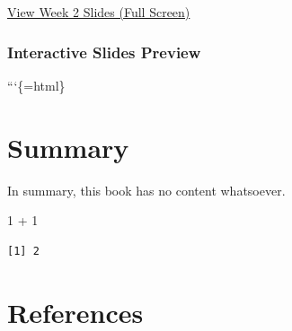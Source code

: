 \documentclass[
  letterpaper,
  DIV=11,
  numbers=noendperiod]{scrreprt}
\newenvironment{Shaded}{\begin{snugshade}}{\end{snugshade}}
\newcommand{\DecValTok}[1]{\textcolor[rgb]{0.68,0.00,0.00}{#1}}
\newcommand{\SpecialCharTok}[1]{\textcolor[rgb]{0.37,0.37,0.37}{#1}}
\begin{document}
\href{week2.html}{View Week 2 Slides (Full Screen)}

\subsection{Interactive Slides
Preview}\label{interactive-slides-preview}

```\{=html\}


\chapter{Summary}\label{summary}

In summary, this book has no content whatsoever.

\begin{Shaded}
\begin{Highlighting}[]
\DecValTok{1} \SpecialCharTok{+} \DecValTok{1}
\end{Highlighting}
\end{Shaded}

\begin{verbatim}
[1] 2
\end{verbatim}


\chapter*{References}\label{references}


\label{refs}
\end{document}
